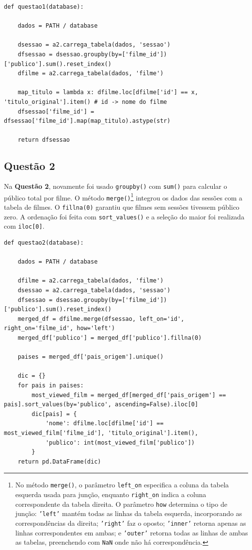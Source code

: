 \documentclass{article}
\begin{document}
\linespread{1}
\begin{lstlisting}
def questao1(database):
    
    dados = PATH / database

    dsessao = a2.carrega_tabela(dados, 'sessao')
    dfsessao = dsessao.groupby(by=['filme_id'])['publico'].sum().reset_index() 
    dfilme = a2.carrega_tabela(dados, 'filme')
    
    map_titulo = lambda x: dfilme.loc[dfilme['id'] == x, 'titulo_original'].item() # id -> nome do filme
    dfsessao['filme_id'] =  dfsessao['filme_id'].map(map_titulo).astype(str)
    
    return dfsessao
\end{lstlisting}
\linespread{1.5}
\subsection*{Questão 2}
Na \textbf{Questão 2}, novamente foi usado \texttt{groupby()} com \texttt{sum()} para calcular o público total por filme. O método \texttt{merge()}\footnote{No método \texttt{merge()}, o parâmetro \texttt{left\_on} especifica a coluna da tabela esquerda usada para junção, enquanto \texttt{right\_on} indica a coluna correspondente da tabela direita. O parâmetro \texttt{how} determina o tipo de junção: \texttt{'left'} mantém todas as linhas da tabela esquerda, incorporando as correspondências da direita; \texttt{'right'} faz o oposto; \texttt{'inner'} retorna apenas as linhas correspondentes em ambas; e \texttt{'outer'} retorna todas as linhas de ambas as tabelas, preenchendo com \texttt{NaN} onde não há correspondência.} integrou os dados das sessões com a tabela de filmes. O \texttt{fillna(0)} garantiu que filmes sem sessões tivessem público zero. A ordenação foi feita com \texttt{sort\_values()} e a seleção do maior foi realizada com \texttt{iloc[0]}.
\linespread{1}
\begin{lstlisting}
def questao2(database):

    dados = PATH / database

    dfilme = a2.carrega_tabela(dados, 'filme')
    dsessao = a2.carrega_tabela(dados, 'sessao')
    dfsessao = dsessao.groupby(by=['filme_id'])['publico'].sum().reset_index()
    merged_df = dfilme.merge(dfsessao, left_on='id', right_on='filme_id', how='left')
    merged_df['publico'] = merged_df['publico'].fillna(0)
    
    paises = merged_df['pais_origem'].unique()
    
    dic = {}
    for pais in paises:        
        most_viewed_film = merged_df[merged_df['pais_origem'] == pais].sort_values(by='publico', ascending=False).iloc[0]
        dic[pais] = {
            'nome': dfilme.loc[dfilme['id'] == most_viewed_film['filme_id'], 'titulo_original'].item(),
            'publico': int(most_viewed_film['publico'])
        }
    return pd.DataFrame(dic) 
\end{lstlisting}
\end{document}
